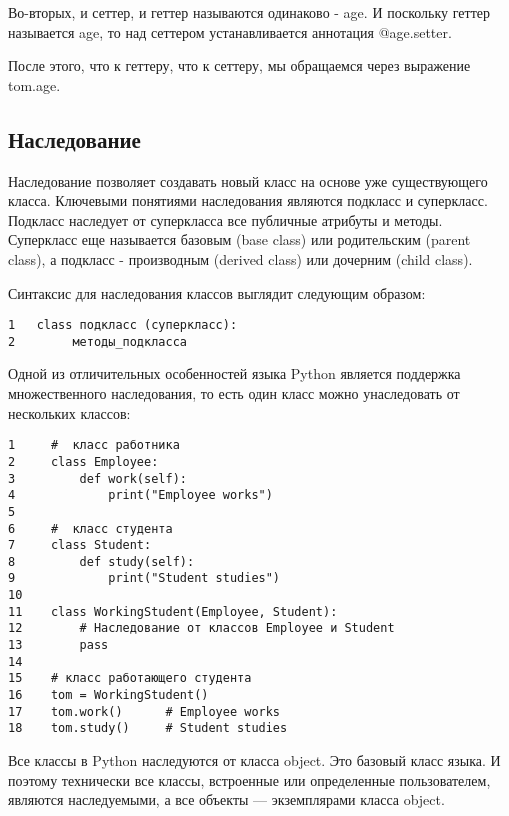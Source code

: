 \documentclass[12pt, a4paper]{article}
\begin{document}
Во-вторых, и сеттер, и геттер называются одинаково - age. И поскольку геттер называется age, то над сеттером устанавливается аннотация @age.setter.

После этого, что к геттеру, что к сеттеру, мы обращаемся через выражение tom.age.

\subsection{Наследование}

Наследование позволяет создавать новый класс на основе уже существующего класса.
Ключевыми понятиями наследования являются подкласс и суперкласс. Подкласс наследует от суперкласса все публичные атрибуты и методы. Суперкласс еще называется базовым (base class) или родительским (parent class), а подкласс - производным (derived class) или дочерним (child class).

\vspace{1em}

Синтаксис для наследования классов выглядит следующим образом:

\begin{verbatim}
1   class подкласс (суперкласс):
2        методы_подкласса
\end{verbatim}

\newpage

Одной из отличительных особенностей языка Python является поддержка множественного наследования, то есть один класс можно унаследовать от нескольких классов:

\begin{verbatim}
1     #  класс работника
2     class Employee:
3         def work(self):
4             print("Employee works")
5      
6     #  класс студента
7     class Student:
8         def study(self):
9             print("Student studies")
10     
11    class WorkingStudent(Employee, Student):        
12        # Наследование от классов Employee и Student
13        pass
14     
15    # класс работающего студента
16    tom = WorkingStudent()
17    tom.work()      # Employee works
18    tom.study()     # Student studies
\end{verbatim}

Все классы в Python наследуются от класса object. Это базовый класс языка.
И поэтому технически все классы, встроенные или определенные пользователем, являются наследуемыми, а все объекты — экземплярами класса object.

\vspace{1em}
\end{document}
